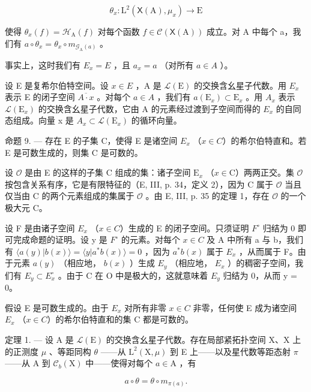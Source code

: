 \[
\theta_ {x} \colon \mathrm{L} ^ {2} (\mathsf {X} (\mathrm{A}), \mu_ {x}) \to \mathrm{E}
\]

使得 \(\theta_x(f) = \mathcal{H}_{\mathrm{A}}(f)\) 对每个函数 \(f \in \mathcal{C}(\mathsf{X}(\mathrm{A}))\) 成立。对 A 中每个 a，我们有 \(a \circ \theta_x = \theta_x \circ m_{\mathcal{G}_{\mathrm{A}}(a)}\) 。

事实上，这时我们有 \(E_{x}=E\) ，且 \(a_{x}=a\) （对所有 \(a\in A\) ）。

设 E 是复希尔伯特空间。设 \(x \in E\) ，A 是 \(\mathcal{L}(\mathrm{E})\) 的交换含幺星子代数。用 \(E_{x}\) 表示 E 的闭子空间 \(\overline{A \cdot x}\) 。对每个 \(a \in A\) ，我们有 \(a(\mathrm{E}_{x}) \subset \mathrm{E}_{x}\) 。用 \(A_{x}\) 表示 \(\mathcal{L}(\mathrm{E}_{x})\) 的交换含幺星子代数，它由 A 的元素经过渡到子空间而得的 \(E_{x}\) 的自同态组成。向量 x 是 \(A_{x} \subset \mathcal{L}(\mathrm{E}_{x})\) 的循环向量。

命题 9. --- 存在 E 的子集 C，使得 E 是诸空间 \(E_{x}\) （\(x \in C\)）的希尔伯特直和。若 E 是可数生成的，则集 C 是可数的。

设 \(\mathcal{O}\) 是由 E 的这样的子集 C 组成的集：诸子空间 \(\mathrm{E}_x\) （\(x\in \mathrm{C}\)）两两正交。集 \(\mathcal{O}\) 按包含关系有序，它是有限特征的（E, III, p. 34，定义 2），因为 C 属于 \(\mathcal{O}\) 当且仅当由 C 的两个元素组成的集属于 \(\mathcal{O}\) 。由 E, III, p. 35 的定理 1，存在 \(\mathcal{O}\) 的一个极大元 C。

设 F 是由诸子空间 \(E_{x}\) （\(x \in C\)）生成的 E 的闭子空间。只须证明 \(F^{\circ}\) 归结为 0 即可完成命题的证明。设 y 是 \(F^{\circ}\) 的元素。对每个 \(x \in C\) 及 A 中所有 a 与 b，我们有 \(\langle a(y) | b(x) \rangle = \langle y | a^{*}b(x) \rangle = 0\) ，因为 \(a^{*}b(x)\) 属于 \(E_{x}\) ，从而属于 F。由于元素 \(a(y)\) （相应地， \(b(x)\) ）生成 \(E_{y}\) （相应地， \(E_{x}\) ）的稠密子空间，我们有 \(E_{y} \subset E_{x}^{\circ}\) 。由于 C 在 O 中是极大的，这就意味着 \(E_{y}\) 归结为 0，从而 y = 0。

假设 E 是可数生成的。由于 \(E_{x}\) 对所有非零 \(x \in C\) 非零，任何使 E 成为诸空间 \(E_{x}\) （\(x \in C\)）的希尔伯特直和的集 C 都是可数的。

定理 1. --- 设 A 是 \(\mathcal{L}(\mathrm{E})\) 的交换含幺星子代数。存在局部紧拓扑空间 X、X 上的正测度 \(\mu\) 、等距同构 \(\theta\) ——从 \(\mathrm{L}^2 (\mathrm{X},\mu)\) 到 E 上——以及星代数等距态射 \(\pi\) ——从 A 到 \(\mathcal{C}_b(\mathrm{X})\) 中——使得对每个 \(a\in \mathrm{A}\) ，有

\[
a \circ \theta = \theta \circ m _ {\pi (a)}.
\]

